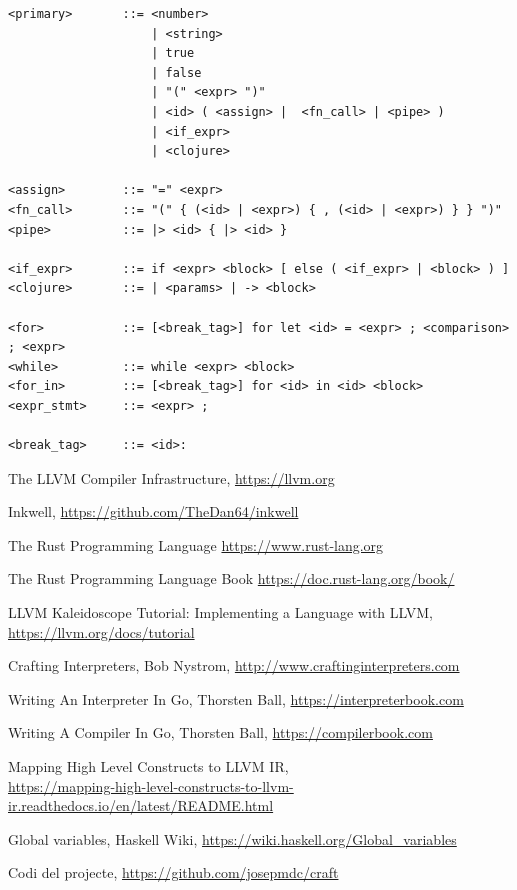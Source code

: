 ﻿\documentclass{article}
\begin{document}
\begin{verbatim}
<primary>       ::= <number> 
                    | <string>
                    | true
                    | false
                    | "(" <expr> ")" 
                    | <id> ( <assign> |  <fn_call> | <pipe> )
                    | <if_expr>
                    | <clojure>

<assign>        ::= "=" <expr>
<fn_call>       ::= "(" { (<id> | <expr>) { , (<id> | <expr>) } } ")"
<pipe>          ::= |> <id> { |> <id> }

<if_expr>       ::= if <expr> <block> [ else ( <if_expr> | <block> ) ]
<clojure>       ::= | <params> | -> <block>

<for>           ::= [<break_tag>] for let <id> = <expr> ; <comparison> ; <expr>
<while>         ::= while <expr> <block>
<for_in>        ::= [<break_tag>] for <id> in <id> <block>
<expr_stmt>     ::= <expr> ;

<break_tag>     ::= <id>:
\end{verbatim}

\begin{thebibliography}{9}
The LLVM Compiler Infrastructure, \url{https://llvm.org}

 Inkwell, \url{https://github.com/TheDan64/inkwell}

 The Rust Programming Language \url{https://www.rust-lang.org}

 The Rust Programming Language Book \url{https://doc.rust-lang.org/book/}

 LLVM Kaleidoscope Tutorial: Implementing a Language with LLVM,\\ \url{https://llvm.org/docs/tutorial}

Crafting Interpreters, Bob Nystrom, \url{http://www.craftinginterpreters.com}

Writing An Interpreter In Go, Thorsten Ball, \url{https://interpreterbook.com}

Writing A Compiler In Go, Thorsten Ball, \url{https://compilerbook.com}

 Mapping High Level Constructs to LLVM IR, \\
\url{https://mapping-high-level-constructs-to-llvm-ir.readthedocs.io/en/latest/README.html}

 Global variables, Haskell Wiki, \url{https://wiki.haskell.org/Global_variables}

 Codi del projecte, \url{https://github.com/josepmdc/craft}

\end{thebibliography}
\end{document}

